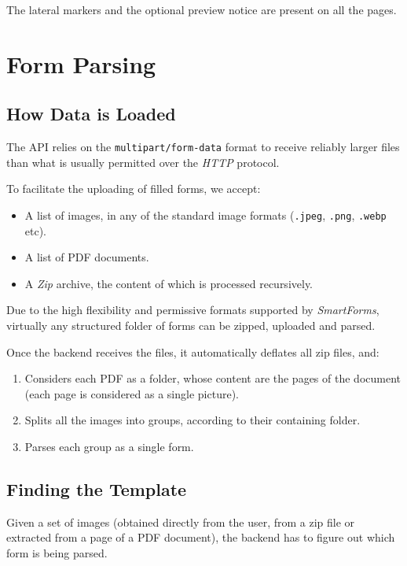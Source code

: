 \documentclass[12pt, a4paper]{report}
\def\code#1{\texttt{#1}}
\begin{document}
The lateral markers and the optional preview notice are present on all the pages.



\chapter{Form Parsing}

\section{How Data is Loaded}

The API relies on the \code{multipart/form-data}\cite{masinter1998rfc2388} format to receive reliably larger files than what is usually permitted over the \textit{HTTP} protocol.

To facilitate the uploading of filled forms, we accept:
\begin{itemize}
    \item A list of images, in any of the standard image formats (\code{.jpeg}, \code{.png}, \code{.webp} etc).
    \item A list of PDF documents.
    \item A \textit{Zip} archive, the content of which is processed recursively.
\end{itemize}

Due to the high flexibility and permissive formats supported by \textit{SmartForms}, virtually any structured folder of forms can be zipped, uploaded and parsed.

Once the backend receives the files, it automatically deflates all zip files, and:
\begin{enumerate}
    \item Considers each PDF as a folder, whose content are the pages of the document (each page is considered as a single picture).
    \item Splits all the images into groups, according to their containing folder.
    \item Parses each group as a single form.
\end{enumerate}

\section{Finding the Template}

Given a set of images (obtained directly from the user, from a zip file or extracted from a page of a PDF document), the backend has to figure out which form is being parsed.
\end{document}
